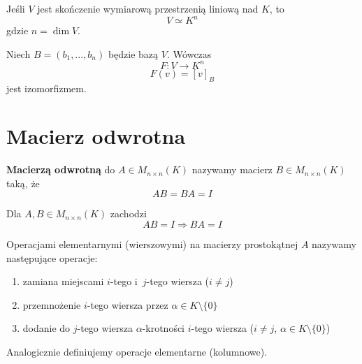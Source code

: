 \begin{tw}
    Jeśli $V$ jest skończenie wymiarową przestrzenią liniową nad $K$, to
  \[V \simeq K^n\]
  gdzie $n=\dim V$.
\end{tw}

\begin{dd}
    Niech $B=(b_1, ..., b_n)$ będzie bazą $V$. Wówczas
  \[F: V \rightarrow K^n\]
  \[F(v) = [v]_B\]
  jest izomorfizmem.
\end{dd}

\section{Macierz odwrotna}

\begin{df}
    \textbf{Macierzą odwrotną} do $A \in M_{n\times n}(K)$ nazywamy macierz
  $B \in M_{n\times n}(K)$ taką, że
  \[AB = BA = I\]
\end{df}

\begin{ft}
    Dla $A,B \in M_{n\times n}(K)$ zachodzi
    \[AB=I \Rightarrow BA=I\]
\end{ft}

\begin{df}
    Operacjami elementarnymi (wierszowymi) na macierzy prostokątnej $A$
    nazywamy następujące operacje:
    \begin{enumerate}[{(}1{)}]
        \item zamiana miejscami $i$-tego i~$j$-tego wiersza ($i \neq j$)
        \item przemnożenie $i$-tego wiersza przez $\alpha \in K \setminus \{0\}$
        \item dodanie do $j$-tego wiersza $\alpha$-krotności $i$-tego wiersza
          ($i \neq j$, $\alpha \in K \setminus \{0\}$)
    \end{enumerate}
    Analogicznie definiujemy operacje elementarne (kolumnowe).
\end{df}


